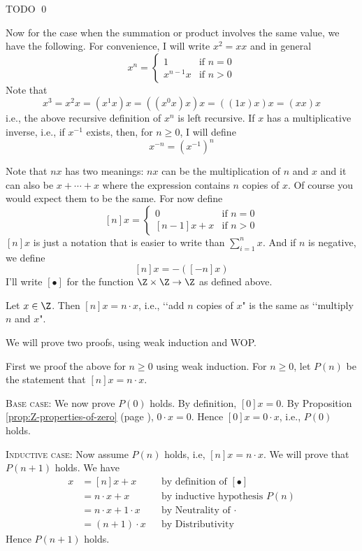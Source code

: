 TODO
\qed

Now for the case when the summation or product involves the same value,
we have the following.
For convenience, I will write $x^2 = xx$ and in general 
\[
x^n =
\begin{cases}
  1       &\text{if } n = 0 \\
  x^{n-1}x &\text{if } n > 0 
\end{cases}
\]
Note that
\[
x^3 = x^2 x = (x^1x) x = ((x^0x)x)x = ((1x)x)x = (xx)x
\]
i.e., the above recursive definition of
$x^n$ is left recursive.
If $x$ has a multiplicative inverse, i.e., if $x^{-1}$ exists,
then, for $n \geq 0$, I will define
\[
x^{-n} = \left( x^{-1} \right)^n
\]

Note that $nx$ has two meanings: $nx$ can be the multiplication of $n$
and $x$ and it can also be $x + \cdots + x$ where the expression
contains $n$ copies of $x$.
Of course you would expect them to be the same.
For now define
\[
  [n]x =
  \begin{cases}
    0       &\text{if } n = 0 \\
    [n-1]x + x &\text{if } n > 0 
  \end{cases}
\]
$[n]x$ is just a notation that is easier to write than $\sum_{i=1}^n x$.
And if $n$ is negative, we define
\[
[n]x = -([-n]x)
\]
I'll write $[\bullet]$ for the function $\Z \times \Z \rightarrow \Z$
as defined above.

\begin{prop}
  Let $x \in \Z$.
  Then $[n]x = n \cdot x$, i.e.,
  \lq\lq add $n$ copies of $x$" is the same as \lq\lq multiply $n$ and $x$".
\end{prop}
\proof
We will prove two proofs, using weak induction and WOP.

First we proof the above for $n \geq 0$ using weak induction.
For $n \geq 0$, let $P(n)$ be the statement that $[n]x = n \cdot x$.

\textsc{Base case:}
We now prove $P(0)$ holds.
By definition, $[0]x = 0$.
By Proposition \ref{prop:Z-properties-of-zero}
(page \pageref{prop:Z-properties-of-zero}), $0 \cdot x = 0$.
Hence $[0]x = 0 \cdot x$, i.e., $P(0)$ holds.

\textsc{Inductive case:}
Now assume $P(n)$ holds, i.e, $[n]x = n \cdot x$.
We will prove that $P(n + 1)$ holds.
We have
\begin{align*}
[n + 1]x &= [n]x + x        & & \text{by definition of $[\bullet]$} \\
         &= n \cdot x + x   & & \text{by inductive hypothesis $P(n)$} \\
         &= n \cdot x + 1 \cdot x & & \text{by Neutrality of $\cdot$} \\
         &= (n + 1)\cdot x  & & \text{by Distributivity} 
\end{align*}
Hence $P(n + 1)$ holds.

